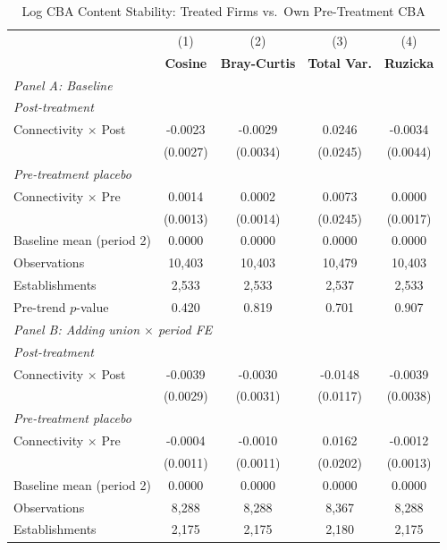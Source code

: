 \begin{table}[H]
\centering
\caption{Log CBA Content Stability: Treated Firms vs.\ Own Pre-Treatment CBA}
\label{tab:treated_self_ln_cba_similarity}
\scriptsize
\setlength{\tabcolsep}{8pt}
\begin{tabular}{lcccc}
\toprule\toprule
 & (1) & (2) & (3) & (4) \\
 & \textbf{Cosine} & \textbf{Bray-Curtis} & \textbf{Total Var.} & \textbf{Ruzicka} \\
\midrule
\multicolumn{5}{l}{\textit{Panel A: Baseline}} \\
\multicolumn{5}{l}{\textit{Post-treatment}} \\
Connectivity $\times$ Post & -0.0023 & -0.0029 & 0.0246 & -0.0034 \\
 & (0.0027) & (0.0034) & (0.0245) & (0.0044) \\
\multicolumn{5}{l}{\textit{Pre-treatment placebo}} \\
Connectivity $\times$ Pre & 0.0014 & 0.0002 & 0.0073 & 0.0000 \\
 & (0.0013) & (0.0014) & (0.0245) & (0.0017) \\
\midrule
Baseline mean (period 2) & 0.0000 & 0.0000 & 0.0000 & 0.0000 \\
Observations &       10,403 &       10,403 &       10,479 &       10,403 \\
Establishments &        2,533 &        2,533 &        2,537 &        2,533 \\
Pre-trend $p$-value & 0.420 & 0.819 & 0.701 & 0.907 \\
\midrule
\multicolumn{5}{l}{\textit{Panel B: Adding union $\times$ period FE}} \\
\multicolumn{5}{l}{\textit{Post-treatment}} \\
Connectivity $\times$ Post & -0.0039 & -0.0030 & -0.0148 & -0.0039 \\
 & (0.0029) & (0.0031) & (0.0117) & (0.0038) \\
\multicolumn{5}{l}{\textit{Pre-treatment placebo}} \\
Connectivity $\times$ Pre & -0.0004 & -0.0010 & 0.0162 & -0.0012 \\
 & (0.0011) & (0.0011) & (0.0202) & (0.0013) \\
\midrule
Baseline mean (period 2) & 0.0000 & 0.0000 & 0.0000 & 0.0000 \\
Observations &        8,288 &        8,288 &        8,367 &        8,288 \\
Establishments &        2,175 &        2,175 &        2,180 &        2,175 \\

\end{tabular}
\end{table}
